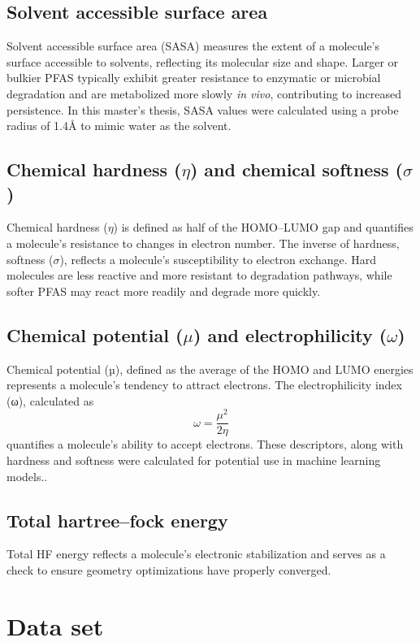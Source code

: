 \subsection{Solvent accessible surface area}

Solvent accessible surface area (SASA) measures the extent of a molecule’s surface accessible to solvents, reflecting its molecular size and shape. Larger or bulkier PFAS typically exhibit greater resistance to enzymatic or microbial degradation and are metabolized more slowly \textit{in vivo}, contributing to increased persistence. In this master’s thesis, SASA values were calculated using a probe radius of 1.4Å to mimic water as the solvent. 

\subsection{Chemical hardness ($\eta$) and chemical softness ($\sigma$)}
Chemical hardness ($\eta$) is defined as half of the HOMO–LUMO gap and quantifies a molecule’s resistance to changes in electron number. The inverse of hardness, softness ($\sigma$), reflects a molecule’s susceptibility to electron exchange. Hard molecules are less reactive and more resistant to degradation pathways, while softer PFAS may react more readily and degrade more quickly.

\subsection{Chemical potential (\(\mu\)) and electrophilicity (\(\omega\))}
Chemical potential (µ), defined as the average of the HOMO and LUMO energies represents a molecule’s tendency to attract electrons. The electrophilicity index (ω), calculated as  \[
\omega = \frac{\mu^2}{2\eta}
\] quantifies a molecule’s ability to accept electrons. These descriptors, along with hardness and softness were calculated for potential use in machine learning models..

\subsection{Total hartree–fock energy}

Total HF energy reflects a molecule's electronic stabilization and serves as a check to ensure geometry optimizations have properly converged. 


\clearpage
\section{Data set}

